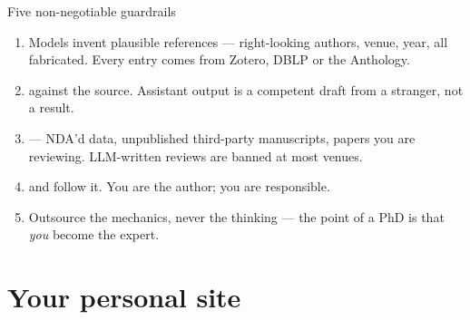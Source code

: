 \documentclass[aspectratio=169,11pt]{beamer}
\begin{document}
\begin{frame}{Five non-negotiable guardrails}
\begin{alertblock}{}
\begin{enumerate}
  \item {} Models invent plausible
        references --- right-looking authors, venue, year, all fabricated.
        Every  entry comes from Zotero, DBLP or the Anthology.
  \item {} against the source. Assistant
        output is a competent draft from a stranger, not a result.
  \item {} --- NDA'd data, unpublished
        third-party manuscripts, papers you are reviewing. LLM-written reviews
        are banned at most venues.
  \item {} and follow it. You are the
        author; you are responsible.
  \item {} Outsource the mechanics, never the
        thinking --- the point of a PhD is that \emph{you} become the expert.
\end{enumerate}
\end{alertblock}
\end{frame}

\section{Your personal site}
\end{document}
